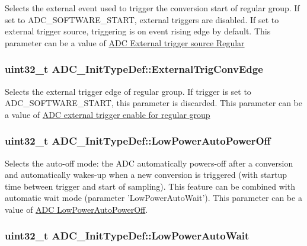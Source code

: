 Selects the external event used to trigger the conversion start of regular group. If set to A\-D\-C\-\_\-\-S\-O\-F\-T\-W\-A\-R\-E\-\_\-\-S\-T\-A\-R\-T, external triggers are disabled. If set to external trigger source, triggering is on event rising edge by default. This parameter can be a value of \hyperlink{group___a_d_c___external__trigger__source___regular}{A\-D\-C External trigger source Regular} \hypertarget{struct_a_d_c___init_type_def_aeed14631d5f1d118a252ea24edd68ede}{
\subsubsection[{External\-Trig\-Conv\-Edge}]{\setlength{\rightskip}{0pt plus 5cm}uint32\-\_\-t A\-D\-C\-\_\-\-Init\-Type\-Def\-::\-External\-Trig\-Conv\-Edge}}\label{struct_a_d_c___init_type_def_aeed14631d5f1d118a252ea24edd68ede}
Selects the external trigger edge of regular group. If trigger is set to A\-D\-C\-\_\-\-S\-O\-F\-T\-W\-A\-R\-E\-\_\-\-S\-T\-A\-R\-T, this parameter is discarded. This parameter can be a value of \hyperlink{group___a_d_c___external__trigger__edge___regular}{A\-D\-C external trigger enable for regular group} \hypertarget{struct_a_d_c___init_type_def_a34caee54ab87dbe4560dad512513fd42}{
\subsubsection[{Low\-Power\-Auto\-Power\-Off}]{\setlength{\rightskip}{0pt plus 5cm}uint32\-\_\-t A\-D\-C\-\_\-\-Init\-Type\-Def\-::\-Low\-Power\-Auto\-Power\-Off}}\label{struct_a_d_c___init_type_def_a34caee54ab87dbe4560dad512513fd42}
Selects the auto-\/off mode\-: the A\-D\-C automatically powers-\/off after a conversion and automatically wakes-\/up when a new conversion is triggered (with startup time between trigger and start of sampling). This feature can be combined with automatic wait mode (parameter 'Low\-Power\-Auto\-Wait'). This parameter can be a value of \hyperlink{group___a_d_c___low_power_auto_power_off}{A\-D\-C Low\-Power\-Auto\-Power\-Off}. \hypertarget{struct_a_d_c___init_type_def_a6ebf4a0acd13047e0ac6316ace559d5d}{
\subsubsection[{Low\-Power\-Auto\-Wait}]{\setlength{\rightskip}{0pt plus 5cm}uint32\-\_\-t A\-D\-C\-\_\-\-Init\-Type\-Def\-::\-Low\-Power\-Auto\-Wait}}\label{struct_a_d_c___init_type_def_a6ebf4a0acd13047e0ac6316ace559d5d}
